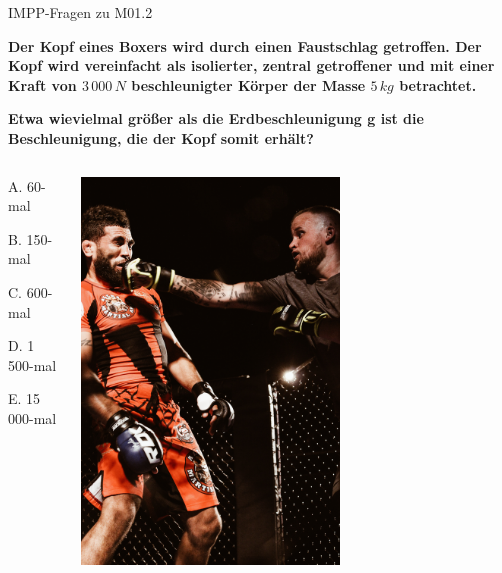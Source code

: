 \documentclass{beamer}
\begin{document}
\begin{frame}{IMPP-Fragen zu M01.2}
    
    \textbf{Der Kopf eines Boxers wird durch einen Faustschlag getroffen. Der Kopf wird vereinfacht als isolierter, zentral getroffener und mit einer Kraft von \(3\,000\,N\) beschleunigter Körper der Masse \(5\,kg\) betrachtet.}
    
   \textbf{ Etwa wievielmal größer als die Erdbeschleunigung g ist die Beschleunigung, die der Kopf somit erhält?    } \\[0.2cm]
    
    

\begin{columns}[c]
\begin{column}{5cm}

    \begin{description}
    \item{A.} 60-mal    %
    \item{B.} 150-mal
    \item{C.} 600-mal
    \item{D.} 1\,500-mal
    \item{E.} 15\,000-mal
    \end{description}

    \end{column}

    \begin{column}{5cm}

\begin{center}
    \includegraphics[width=0.6\textwidth]{boxer.jpg}
\end{center}
    
    \end{column}

    
    \end{columns}
    
\end{frame}
\end{document}
